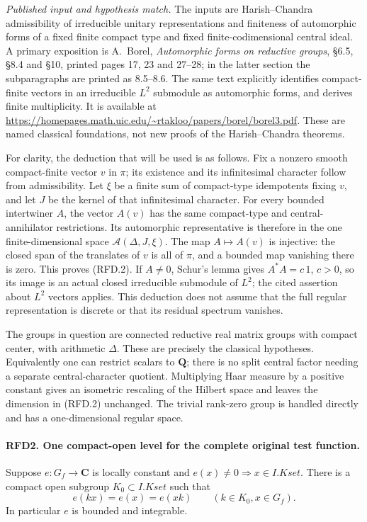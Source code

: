 \documentclass[11pt,a4paper]{article}
\numberwithin{equation}{section}
\theoremstyle{remark}\newtheorem{remark}[theorem]{Remark}
\begin{document}
\emph{Published input and hypothesis match.}
The inputs are Harish--Chandra admissibility of irreducible unitary
representations and finiteness of automorphic forms of a fixed finite
compact type and fixed finite-codimensional central ideal.  A primary
exposition is A.~Borel, \emph{Automorphic forms on reductive groups},
\S6.5, \S8.4 and \S10, printed pages 17, 23 and 27--28; in the latter section
the subparagraphs are printed as 8.5--8.6.  The same text explicitly
identifies compact-finite vectors in an irreducible \(L^2\) submodule
as automorphic forms, and derives finite multiplicity.  It is available at
\url{https://homepages.math.uic.edu/~rtakloo/papers/borel/borel3.pdf}.
These are named classical foundations, not new proofs of the
Harish--Chandra theorems.

For clarity, the deduction that will be used is as follows.  Fix a
nonzero smooth compact-finite vector \(v\) in \(\pi\); its existence
and its infinitesimal character follow from admissibility.  Let
\(\xi\) be a finite sum of compact-type idempotents fixing \(v\),
and let \(J\) be the kernel of that infinitesimal character.
For every bounded intertwiner \(A\), the vector \(A(v)\) has the
same compact-type and central-annihilator restrictions.  Its
automorphic representative is therefore in the one finite-dimensional
space \(\mathcal A(\Delta,J,\xi)\).  The map \(A\mapsto A(v)\)
is injective: the closed span of the translates of \(v\) is all of
\(\pi\), and a bounded map vanishing there is zero.  This proves
(RFD.2).  If \(A\ne0\), Schur's lemma gives \(A^*A=c\,1\),
\(c>0\), so its image is an actual closed irreducible submodule of
\(L^2\); the cited assertion about \(L^2\) vectors applies.
This deduction does not assume that the full regular representation
is discrete or that its residual spectrum vanishes.

The groups in question are connected reductive real matrix groups
with compact center, with arithmetic \(\Delta\).  These are precisely
the classical hypotheses.  Equivalently one can restrict scalars to
\(\mathbf Q\); there is no split central factor needing a separate
central-character quotient.  Multiplying Haar measure by a positive
constant gives an isometric rescaling of the Hilbert space and leaves
the dimension in (RFD.2) unchanged.  The trivial rank-zero group is
handled directly and has a one-dimensional regular space.

\paragraph{RFD2. One compact-open level for the complete original test function.}
\label{claim:RFD2}
Suppose \(e:G_f\to\mathbf C\) is locally constant and
\(e(x)\ne0\Rightarrow x\in I.Kset\).  There is a compact open
subgroup \(K_0\subset I.Kset\) such that
\[
             e(kx)=e(x)=e(xk)\qquad(k\in K_0, x\in G_f).
 \tag{RFD.3}
\]
In particular \(e\) is bounded and integrable.
\end{document}

